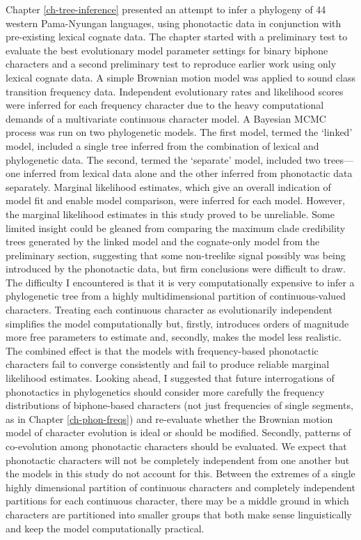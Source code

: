 Chapter \ref{ch-tree-inference} presented an attempt to infer a phylogeny of 44 western Pama-Nyungan languages, using phonotactic data in conjunction with pre-existing lexical cognate data. The chapter started with a preliminary test to evaluate the best evolutionary model parameter settings for binary biphone characters and a second preliminary test to reproduce earlier work \autocite{bouckaert_origin_2018} using only lexical cognate data. A simple Brownian motion model was applied to sound class transition frequency data. Independent evolutionary rates and likelihood scores were inferred for each frequency character due to the heavy computational demands of a multivariate continuous character model. A Bayesian MCMC process was run on two phylogenetic models. The first model, termed the `linked' model, included a single tree inferred from the combination of lexical and phylogenetic data. The second, termed the `separate' model, included two trees---one inferred from lexical data alone and the other inferred from phonotactic data separately. Marginal likelihood estimates, which give an overall indication of model fit and enable model comparison, were inferred for each model. However, the marginal likelihood estimates in this study proved to be unreliable. Some limited insight could be gleaned from comparing the maximum clade credibility trees generated by the linked model and the cognate-only model from the preliminary section, suggesting that some non-treelike signal possibly was being introduced by the phonotactic data, but firm conclusions were difficult to draw. The difficulty I encountered is that it is very computationally expensive to infer a phylogenetic tree from a highly multidimensional partition of continuous-valued characters. Treating each continuous character as evolutionarily independent simplifies the model computationally but, firstly, introduces orders of magnitude more free parameters to estimate and, secondly, makes the model less realistic. The combined effect is that the models with frequency-based phonotactic characters fail to converge consistently and fail to produce reliable marginal likelihood estimates. Looking ahead, I suggested that future interrogations of phonotactics in phylogenetics should consider more carefully the frequency distributions of biphone-based characters (not just frequencies of single segments, as in Chapter \ref{ch-phon-freqs}) and re-evaluate whether the Brownian motion model of character evolution is ideal or should be modified. Secondly, patterns of co-evolution among phonotactic characters should be evaluated. We expect that phonotactic characters will not be completely independent from one another but the models in this study do not account for this. Between the extremes of a single highly dimensional partition of continuous characters and completely independent partitions for each continuous character, there may be a middle ground in which characters are partitioned into smaller groups that both make sense linguistically and keep the model computationally practical.

